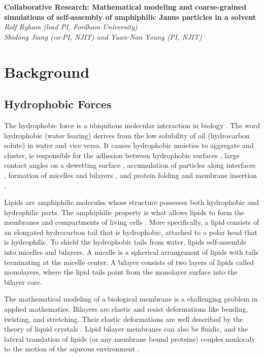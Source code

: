 
\noindent
{\bf {Collaborative Research: Mathematical modeling and coarse-grained simulations of self-assembly of amphiphilic Janus particles in a solvent}}\\
{\it Rolf Ryham (lead PI, Fordham University)}\\
{\it Shidong Jiang (co-PI, NJIT) and Yuan-Nan Young (PI, NJIT)}
\section{Background}
\label{sec:background}
\subsection{Hydrophobic Forces}
\label{sec:hydrophobicforce}

The hydrophobic force is a ubiquitous molecular interaction in biology \cite{Israelachvili1954}.
The word hydrophobic (water fearing) derives from the low solubility of oil (hydrocarbon solute) in water and vice versa. 
It causes hydrophobic moieties to aggregate and cluster,
is responsible for the adhesion between hydrophobic surfaces \cite{Ducker2016}, large contact angles on a 
dewetting surface \cite{Arenas2019,Sandre1999}, accumulation of particles along interfaces \cite{Lee2013,Lee2014}, 
formation of micelles and bilayers \cite{Israelachvili80}, and protein folding and membrane insertion \cite{Kabelka2018}.

Lipids are amphiphilic molecules whose  structure possesses
both hydrophobic and hydrophilic parts. 
The amphiphilic property is what allows lipids to form the membranes and 
compartments of living cells \cite{Israelachvili80}. 
More specifically, a lipid consists of 
an elongated hydrocarbon tail that is hydrophobic, attached to a polar head that is hydrophilic.
To shield the hydrophobic tails from water, lipids self-assemble into micelles and bilayers. 
A micelle is a spherical arrangement of lipids with tails terminating at the micelle center. 
A bilayer consists of two layers of lipids called monolayers, where the lipid tails point 
from the monolayer surface into the bilayer core. 

The mathematical modeling of a biological membrane is a challenging problem in applied mathematics. 
Bilayers are elastic and resist deformations like bending, twisting, and stretching.
Their elastic deformations are well described by the theory of liquid crystals \cite{ANDRIENKO2018520}.
Lipid bilayer membranes can also be fluidic, and the lateral translation of lipids (or any membrane bound
proteins) couples nonlocaly to the motion of the aqueous environment \cite{MerkelSackmannEvans1989,StoneAjdari1998_JFM,OppenheimerDiamant2009_BJ,OppenheimerDiamant2011_PRL}. 

